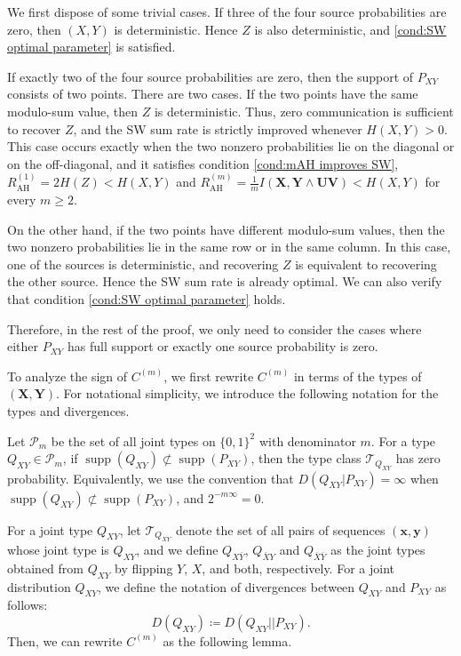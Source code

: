 \documentclass[journal,onecolumn]{IEEEtran}
\theoremstyle{definition}
\theoremstyle{remark}
\newcommand{\Dxy}{D({Q_{XY}})}
\newcommand{\Qxy}{Q_{XY}}
\newcommand{\Qxby}{Q_{X\bar{Y}}}
\newcommand{\Qbxy}{Q_{\bar{X}Y}}
\newcommand{\Qbxby}{Q_{\bar{X}\bar{Y}}}
\newcommand{\xm}{\bm{x}}
\newcommand{\ym}{\bm{y}}
\newcommand{\Xm}{\bm{X}}
\newcommand{\Ym}{\bm{Y}}
\newcommand{\Um}{\bm{U}}
\newcommand{\Vm}{\bm{V}}
\begin{document}
    We first dispose of some trivial cases.
    If three of the four source probabilities are zero, then $(X,Y)$ is deterministic.
    Hence $Z$ is also deterministic, and \eqref{cond:SW optimal parameter} is satisfied.

    If exactly two of the four source probabilities are zero, then the support of $P_{XY}$ consists of two points.
    There are two cases.
    If the two points have the same modulo-sum value, then $Z$ is deterministic.
    Thus, zero communication is sufficient to recover $Z$, and the SW sum rate is strictly improved whenever $H(X,Y)>0$.
    This case occurs exactly when the two nonzero probabilities lie on the diagonal or on the off-diagonal, 
    and it satisfies condition \eqref{cond:mAH improves SW}, 
    $R_{\mathrm{AH}}^{(1)}=2H(Z)<H(X,Y)$ and 
    $R_{\mathrm{AH}}^{(m)}=\frac{1}{m}I(\Xm,\Ym\wedge\Um\Vm)<H(X,Y)$ for every $m\geq 2$.
    

    On the other hand, if the two points have different modulo-sum values, then the two nonzero probabilities lie in the same row or in the same column.
    In this case, one of the sources is deterministic, and recovering $Z$ is equivalent to recovering the other source.
    Hence the SW sum rate is already optimal.
    We can also verify that condition \eqref{cond:SW optimal parameter} holds.

    Therefore, in the rest of the proof, we only need to consider the cases where either $P_{XY}$ has full support or exactly one source probability is zero.

    To analyze the sign of $C^{(m)}$, we first rewrite $C^{(m)}$ in terms of the types of $(\Xm,\Ym)$.
    For notational simplicity, we introduce the following notation for the types and divergences.
    
    Let $\mathcal P_m$ be the set of all joint types on $\{0,1\}^2$ with denominator $m$. For a type $Q_{XY}\in\mathcal P_m$, if $\operatorname{supp}(Q_{XY})\not\subset\operatorname{supp}(P_{XY})$, then the type class $\mathcal{T}_{Q_{XY}}$ has zero probability.
    Equivalently, we use the convention that $D(Q_{XY}|P_{XY})=\infty$ when $\operatorname{supp}(Q_{XY})\not\subset\operatorname{supp}(P_{XY})$, and $2^{-m\infty}=0$.

    For a joint type $\Qxy$, let $\mathcal{T}_{\Qxy}$ denote the set of all pairs of sequences $(\xm,\ym)$ whose joint type is $\Qxy$,
    and we define $\Qxby$, $\Qbxy$ and $\Qbxby$ as the joint types obtained from $\Qxy$ by flipping $Y$, $X$, and both, respectively.
    For a joint distribution $\Qxy$, we define the notation of divergences between $\Qxy$ and $P_{XY}$ as follows:
    \begin{equation}\label{nt:divergence}
        \Dxy \coloneq D(\Qxy||P_{XY}).
    \end{equation}
    Then, we can rewrite $C^{(m)}$ as the following lemma.
\end{document}
